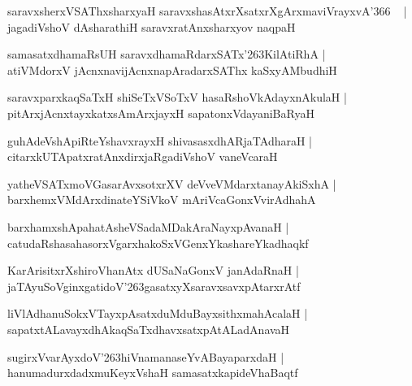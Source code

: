 \documentclass[twoside,12pt,openright]{book}
\def\S{\char'263}
\newcounter{shloka}[chapter]
\begin{document}
\begin{shloka}%
saravxsherxVSAThxsharxyaH saravxshasAtxrXsatxrXgArxmaviVrayxvA\char'366 ~ |\\
jagadiVshoV dAsharathiH saravxratAnxsharxyov naqpaH 
\end{shloka}

\begin{shloka}%
samasatxdhamaRsUH saravxdhamaRdarxSATx\S KilAtiRhA |\\
atiVMdorxV jAcnxnavijAcnxnapAradarxSAThx kaSxyAMbudhiH 
\end{shloka}

\begin{shloka}%
saravxparxkaqSaTxH shiSeTxVSoTxV hasaRshoVkAdayxnAkulaH |\\
pitArxjAcnxtayxkatxsAmArxjayxH sapatonxVdayaniBaRyaH 
\end{shloka}

\begin{shloka}%
guhAdeVshApiRteYshavxrayxH shivasasxdhARjaTAdharaH |\\
citarxkUTApatxratAnxdirxjaRgadiVshoV vaneVcaraH 
\end{shloka}

\begin{shloka}%
yatheVSATxmoVGasarAvxsotxrXV deVveVMdarxtanayAkiSxhA |\\
barxhemxVMdArxdinateYSiVkoV mAriVcaGonxVvirAdhahA 
\end{shloka}

\begin{shloka}%
barxhamxshApahatAsheVSadaMDakAraNayxpAvanaH |\\
catudaRshasahasorxVgarxhakoSxVGenxYkashareYkadhaqkf 
\end{shloka}

\begin{shloka}%
KarArisitxrXshiroVhanAtx dUSaNaGonxV janAdaRnaH |\\
jaTAyuSoVginxgatidoV\S gasatxyXsaravxsavxpAtarxrAtf
\end{shloka}

\begin{shloka}%
liVlAdhanuSokxVTayxpAsatxduMduBayxsithxmahAcalaH |\\
sapatxtALavayxdhAkaqSaTxdhavxsatxpAtALadAnavaH
\end{shloka}

\begin{shloka}%
sugirxVvarAyxdoV\S hiVnamanaseYvABayaparxdaH |\\
hanumadurxdadxmuKeyxVshaH samasatxkapideVhaBaqtf 
\end{shloka}
\end{document}
